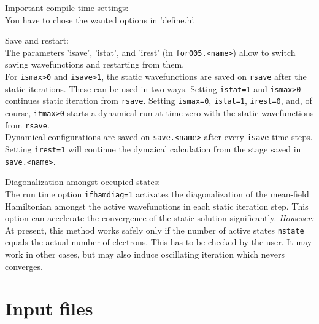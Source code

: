 \documentclass[12pt]{article}
\begin{document}
\begin{description}

 \item{Important compile-time settings:}\\
  You have to chose the wanted options in 'define.h'.

 \item{Save and restart:}\\
  The parameters 'isave', 'istat', and 'irest' (in {\tt for005.<name>}) allow to switch 
  saving wavefunctions and restarting from them.\\
  For {\tt ismax>0} and  {\tt isave>1}, 
  the static wavefunctions are saved on {\tt rsave}
  after the static iterations. These can be used in two ways.
  Setting  {\tt istat=1} and  {\tt ismax>0} continues static
  iteration from  {\tt rsave}. Setting  {\tt ismax=0},  {\tt istat=1},
  {\tt irest=0}, and, of course,  {\tt itmax>0} starts a dynamical
  run at time zero with the static wavefunctions from  {\tt rsave}.
  \\
  Dynamical configurations are saved on  {\tt save.<name>} after every
  {\tt isave} time steps. Setting  {\tt irest=1} will
  continue the dymaical calculation 
  from the stage saved in  {\tt save.<name>}.

 \item{Diagonalization amongst occupied states:}\\
  The run time option {\tt ifhamdiag=1}
  activates the diagonalization of the mean-field Hamiltonian
  amongst the active wavefunctions in each static iteration
  step. This option can accelerate the convergence of the static
  solution significantly. {\it However:} At present, this method works 
  safely only if the number of active states {\tt nstate}
  equals the actual number of electrons. This has to be checked 
  by the user. It may work in other cases, but may also induce
  oscillating iteration  which nevers converges.
  

\end{description}

\newpage
\section{Input files}
\label{sec:inputs}
\end{document}
